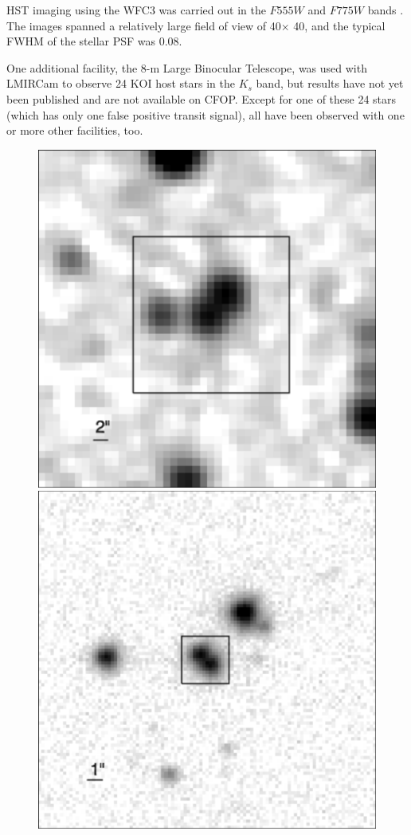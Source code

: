 \documentclass[twocolumn,appendixfloats]{aastex6}
\begin{document}
HST imaging using the WFC3 was carried out in the $F555W$ and $F775W$ 
bands \citep{gilliland15, cartier15}. The images spanned a relatively large
field of view of 40\arcsec $\times$ 40\arcsec, and the typical FWHM of the 
stellar PSF was 0.08\arcsec. 

One additional facility, the 8-m Large Binocular Telescope, was used with 
LMIRCam to observe 24 KOI host stars in the $K_s$ band, but results have 
not yet been published and are not available on CFOP. Except for one of 
these 24 stars (which has only one false positive transit signal), all have 
been observed with one or more other facilities, too.


\begin{figure}[!t]
\centering
\includegraphics[scale=0.4]{KOI2174_2MASS_J.pdf}
\includegraphics[scale=0.4]{KOI2174_UKIRT_J.pdf}

\end{figure}
\end{document}
